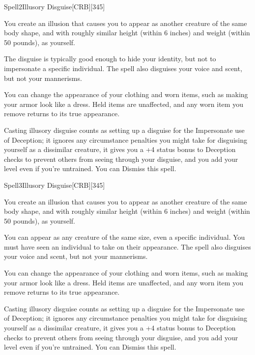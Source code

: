 \begin{card}{Spell}{2}{Illusory Disguise}[CRB][345]



\bgroup
\engschrift\small

You create an illusion that causes you to appear as another creature of the same body shape,
and with roughly similar height (within 6 inches) and weight (within 50 pounds), as yourself.

The disguise is typically good enough to hide your identity, but not to impersonate a specific individual.
The spell also disguises your voice and scent, but not your mannerisms.

You can change the appearance of your clothing and worn items, such as making your armor look like a dress.
Held items are unaffected, and any worn item you remove returns to its true appearance.

Casting illusory disguise counts as setting up a disguise for the Impersonate use of Deception;
it ignores any circumstance penalties you might take for disguising yourself as a dissimilar creature,
it gives you a +4 status bonus to Deception checks to prevent others from seeing through your disguise,
and you add your level even if you're untrained.
You can Dismiss this spell.

\egroup
\end{card}


\begin{card}{Spell}{3}{Illusory Disguise}[CRB][345]



\bgroup
\engschrift\small

You create an illusion that causes you to appear as another creature of the same body shape,
and with roughly similar height (within 6 inches) and weight (within 50 pounds), as yourself.

You can appear as any creature of the same size, even a specific individual.
You must have seen an individual to take on their appearance.
The spell also disguises your voice and scent, but not your mannerisms.

You can change the appearance of your clothing and worn items, such as making your armor look like a dress.
Held items are unaffected, and any worn item you remove returns to its true appearance.

Casting illusory disguise counts as setting up a disguise for the Impersonate use of Deception;
it ignores any circumstance penalties you might take for disguising yourself as a dissimilar creature,
it gives you a +4 status bonus to Deception checks to prevent others from seeing through your disguise,
and you add your level even if you're untrained.
You can Dismiss this spell.

\egroup
\end{card}
